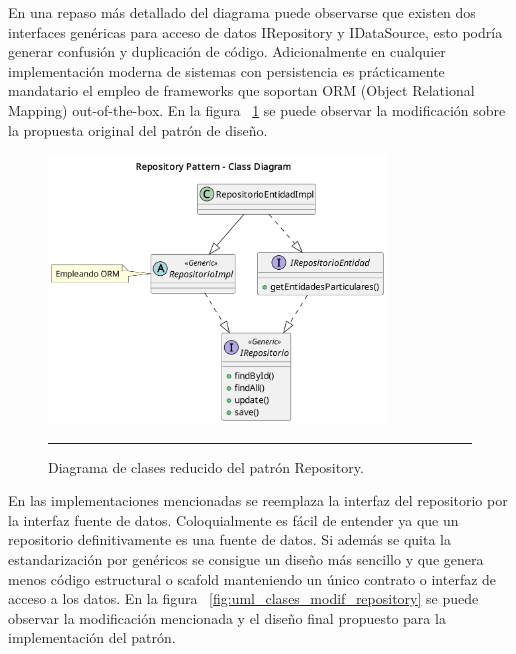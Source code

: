 En una repaso más detallado del diagrama puede observarse que existen dos interfaces genéricas para acceso de datos IRepository y IDataSource, esto podría generar confusión y duplicación de código. Adicionalmente en cualquier implementación moderna de sistemas con persistencia es prácticamente mandatario el empleo de frameworks que soportan ORM (Object Relational Mapping) out-of-the-box.
En la figura ~\ref{fig:uml_clases_detalles_repository} se puede observar la modificación sobre la propuesta original del patrón de diseño.

\begin{figure}[htbp]
	\centering
	\includegraphics[width=0.8\textwidth]{Figures/design/CLASS_repository_less.png}
	\rule{35em}{1pt}
	\caption[Repository Pattern Detailed Class Diagram]{Diagrama de clases reducido del patrón Repository.}
	\label{fig:uml_clases_detalles_repository}
\end{figure}

En las implementaciones mencionadas se reemplaza la interfaz del repositorio por la interfaz fuente de datos. Coloquialmente es fácil de entender ya que un repositorio definitivamente es una fuente de datos. Si además se quita la estandarización por genéricos se consigue un diseño más sencillo y que genera menos código estructural o scafold manteniendo un único contrato o interfaz de acceso a los datos. En la figura ~\ref{fig:uml_clases_modif_repository} se puede observar la modificación mencionada y el diseño final propuesto para la implementación del patrón.

